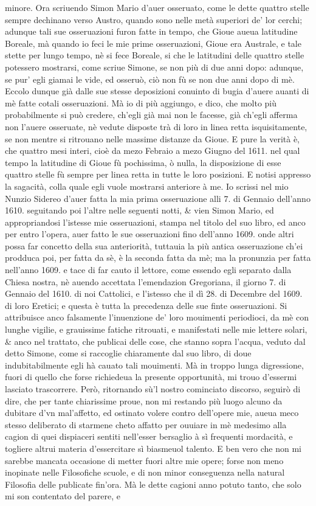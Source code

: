 \documentclass[11pt,twoside,openany]{book}
\begin{document}
minore. Ora scriuendo Simon Mario d'auer osseruato, come le dette quattro stelle sempre dechinano verso Austro, quando sono nelle metà superiori de' lor cerchi; adunque tali sue osseruazioni furon fatte in tempo, che Gioue aueua latitudine Boreale, mà quando io feci le mie prime osseruazioni, Gioue era Australe, e tale stette per lungo tempo, nè si fece Boreale, si che le latitudini delle quattro stelle potessero mostrarsi, come scriue Simone, se non più di due anni dopo: adunque, se pur' egli giamai le vide, ed osseruò, ciò non fù se non due anni dopo di mè. Eccolo dunque già dalle sue stesse deposizioni conuinto di bugia d'auere auanti di mè fatte cotali osseruazioni. Mà io di più aggiungo, e dico, che molto più probabilmente si può credere, ch'egli già mai non le facesse, già ch'egli afferma non l'auere osseruate, nè vedute disposte trà di loro in linea retta isquisitamente, se non mentre si ritrouano nelle massime distanze da Gioue. E pure la verità è, che quattro mesi interi, cioè da mezo Febraio a mezo Giugno del 1611. nel qual tempo la latitudine di Gioue fù pochissima, ò nulla, la disposizione di esse quattro stelle fù sempre per linea retta in tutte le loro posizioni. E notisi appresso la sagacità, colla quale egli vuole mostrarsi anteriore à me. Io scrissi nel mio Nunzio Sidereo d'auer fatta la mia prima osseruazione alli 7. di Gennaio dell'anno 1610. seguitando poi l'altre nelle seguenti notti, \& vien Simon Mario, ed appropriandosi l'istesse mie osseruazioni, stampa nel titolo del suo libro, ed anco per entro l'opera, auer fatto le sue osseruazioni fino dell'anno 1609. onde altri possa far concetto della sua anteriorità, tuttauia la più antica osseruazione ch'ei prodduca poi, per fatta da sè, è la seconda fatta da mè; ma la pronunzia per fatta nell'anno 1609. e tace di far cauto il lettore, come essendo egli separato dalla Chiesa nostra, nè auendo accettata l'emendazion Gregoriana, il giorno 7. di Gennaio del 1610. di noi Cattolici, e l'istesso che il dì 28. di Decembre del 1609. di loro Eretici; e questa è tutta la precedenza delle sue finte osseruazioni. Si attribuisce anco falsamente l'inuenzione de' loro mouimenti periodioci, da mè con lunghe vigilie, e grauissime fatiche ritrouati, e manifestati nelle mie lettere solari, \& anco nel trattato, che publicai delle cose, che stanno sopra l'acqua, veduto dal detto Simone, come si raccoglie chiaramente dal suo libro, di doue indubitabilmente egli hà cauato tali mouimenti. Mà in troppo lunga digressione, fuori di quello che forse richiedeua la presente opportunità, mi trouo d'essermi lasciato trascorrere. Però, ritornando sù'l nostro cominciato discorso, seguirò di dire, che per tante chiarissime proue, non mi restando più luogo alcuno da dubitare d'vn mal'affetto, ed ostinato volere contro dell'opere mie, aueua meco stesso deliberato di starmene cheto affatto per ouuiare in mè medesimo alla cagion di quei dispiaceri sentiti nell'esser bersaglio à sì frequenti mordacità, e togliere altrui materia d'essercitare sì biasmeuol talento. E ben vero che non mi sarebbe mancata occasione di metter fuori altre mie opere; forse non meno inopinate nelle Filosofiche scuole, e di non minor conseguenza nella natural Filosofia delle publicate fin'ora. Mà le dette cagioni anno potuto tanto, che solo mi son contentato del parere, e 
\end{document}
